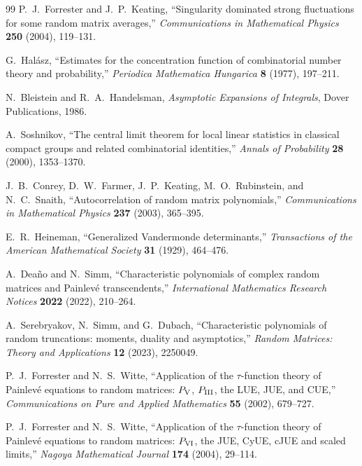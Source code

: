 \begin{thebibliography}{99}
P.~J.~Forrester and J.~P.~Keating,
``Singularity dominated strong fluctuations for some random matrix averages,''
\emph{Communications in Mathematical Physics} \textbf{250} (2004), 119--131.

G.~Hal\'asz,
``Estimates for the concentration function of combinatorial number theory and
probability,''
\emph{Periodica Mathematica Hungarica} \textbf{8} (1977), 197--211.

N.~Bleistein and R.~A.~Handelsman,
\emph{Asymptotic Expansions of Integrals},
Dover Publications, 1986.

A.~Soshnikov,
``The central limit theorem for local linear statistics in classical compact groups and
related combinatorial identities,''
\emph{Annals of Probability} \textbf{28} (2000), 1353--1370.

J.~B.~Conrey, D.~W.~Farmer, J.~P.~Keating, M.~O.~Rubinstein, and N.~C.~Snaith,
``Autocorrelation of random matrix polynomials,''
\emph{Communications in Mathematical Physics} \textbf{237} (2003), 365--395.

E.~R.~Heineman,
``Generalized Vandermonde determinants,''
\emph{Transactions of the American Mathematical Society} \textbf{31} (1929),
464--476.

A.~Dea\~no and N.~Simm,
``Characteristic polynomials of complex random matrices and Painlev\'e transcendents,''
\emph{International Mathematics Research Notices} \textbf{2022} (2022), 210--264.

A.~Serebryakov, N.~Simm, and G.~Dubach,
``Characteristic polynomials of random truncations: moments, duality and asymptotics,''
\emph{Random Matrices: Theory and Applications} \textbf{12} (2023), 2250049.

P.~J.~Forrester and N.~S.~Witte,
``Application of the $\tau$-function theory of Painlev\'e equations to random matrices:
$P_{\rm V}$, $P_{\rm III}$, the LUE, JUE, and CUE,''
\emph{Communications on Pure and Applied Mathematics} \textbf{55} (2002), 679--727.

P.~J.~Forrester and N.~S.~Witte,
``Application of the $\tau$-function theory of Painlev\'e equations to random matrices:
$P_{\rm VI}$, the JUE, CyUE, cJUE and scaled limits,''
\emph{Nagoya Mathematical Journal} \textbf{174} (2004), 29--114.


\end{thebibliography}
